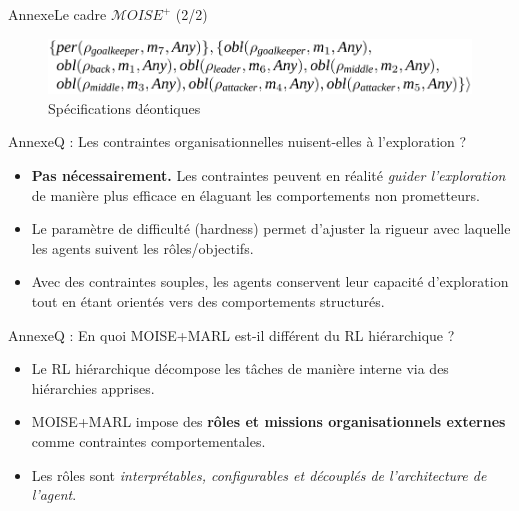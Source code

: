\begin{frame}{Annexe}{Le cadre $\mathcal{M}OISE^+$ (2/2)}
    \ \\

    \begin{minipage}{\textwidth}
        \centering
        \begin{figure}[H]
            \centering
            \includegraphics[width=0.4\linewidth]{figures/soccer_ds.png}
            \caption*{Spécifications déontiques}
        \end{figure}
    \end{minipage}

\end{frame}

\begin{frame}{Annexe}{Q : Les contraintes organisationnelles nuisent-elles à l'exploration ?}
    \begin{itemize}
        \item \textbf{Pas nécessairement.} Les contraintes peuvent en réalité \textit{guider l'exploration} de manière plus efficace en élaguant les comportements non prometteurs.
        \item Le paramètre de difficulté (hardness) permet d’ajuster la rigueur avec laquelle les agents suivent les rôles/objectifs.
        \item Avec des contraintes souples, les agents conservent leur capacité d'exploration tout en étant orientés vers des comportements structurés.
    \end{itemize}
\end{frame}

\begin{frame}{Annexe}{Q : En quoi MOISE+MARL est-il différent du RL hiérarchique ?}
    \begin{itemize}
        \item Le RL hiérarchique décompose les tâches de manière interne via des hiérarchies apprises.
        \item MOISE+MARL impose des \textbf{rôles et missions organisationnels externes} comme contraintes comportementales.
        \item Les rôles sont \textit{interprétables, configurables et découplés de l’architecture de l’agent}.
    \end{itemize}
\end{frame}


